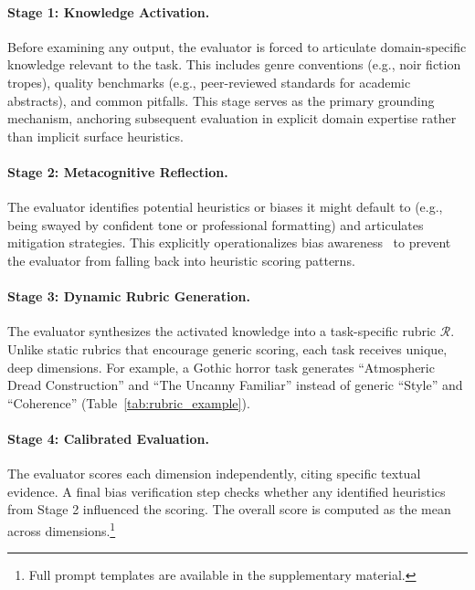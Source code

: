\documentclass{article}
\begin{document}
\paragraph{Stage 1: Knowledge Activation.} Before examining any output, the evaluator is forced to articulate domain-specific knowledge relevant to the task. This includes genre conventions (e.g., noir fiction tropes), quality benchmarks (e.g., peer-reviewed standards for academic abstracts), and common pitfalls. This stage serves as the primary grounding mechanism, anchoring subsequent evaluation in explicit domain expertise rather than implicit surface heuristics.

\paragraph{Stage 2: Metacognitive Reflection.} The evaluator identifies potential heuristics or biases it might default to (e.g., being swayed by confident tone or professional formatting) and articulates mitigation strategies. This explicitly operationalizes bias awareness~\citep{wang2023large, wataoka2024self} to prevent the evaluator from falling back into heuristic scoring patterns.

\paragraph{Stage 3: Dynamic Rubric Generation.} The evaluator synthesizes the activated knowledge into a task-specific rubric $\mathcal{R}$. Unlike static rubrics that encourage generic scoring, each task receives unique, deep dimensions. For example, a Gothic horror task generates ``Atmospheric Dread Construction'' and ``The Uncanny Familiar'' instead of generic ``Style'' and ``Coherence'' (Table~\ref{tab:rubric_example}).

\paragraph{Stage 4: Calibrated Evaluation.} The evaluator scores each dimension independently, citing specific textual evidence. A final bias verification step checks whether any identified heuristics from Stage 2 influenced the scoring. The overall score is computed as the mean across dimensions.\footnote{Full prompt templates are available in the supplementary material.}
\end{document}
